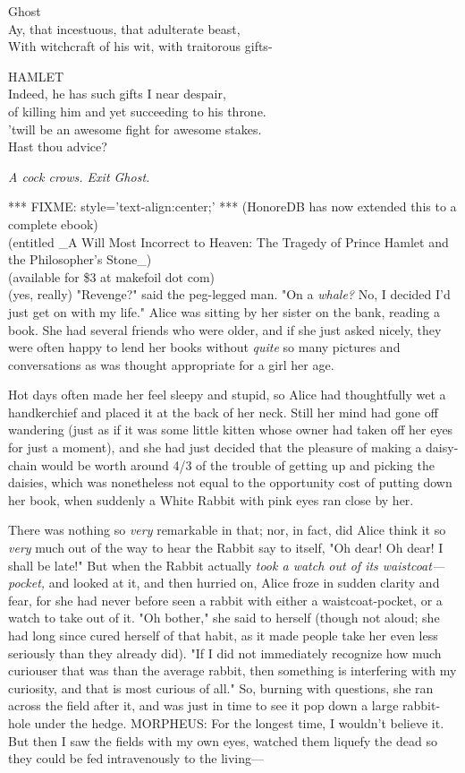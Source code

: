 Ghost\\
Ay, that incestuous, that adulterate beast,\\
With witchcraft of his wit, with traitorous gifts-

HAMLET\\
Indeed, he has such gifts I near despair,\\
of killing him and yet succeeding to his throne.\\
'twill be an awesome fight for awesome stakes.\\
Hast thou advice?

\emph{A cock crows. Exit Ghost.}

*** FIXME: style='text-align:center;' ***
(HonoreDB has now extended this to a complete ebook)\\
(entitled \_A Will Most Incorrect to Heaven: The Tragedy of Prince Hamlet and 
the Philosopher's Stone\_)\\
(available for \$3 at makefoil dot com)\\
(yes, really)
\sbreak
"Revenge?" said the peg-legged man. "On a \emph{whale?} No, I decided I'd just 
get on with my life."
\sbreak
Alice was sitting by her sister on the bank, reading a book. She had several 
friends who were older, and if she just asked nicely, they were often happy to 
lend her books without \emph{quite} so many pictures and conversations as was 
thought appropriate for a girl her age.

Hot days often made her feel sleepy and stupid, so Alice had thoughtfully wet a 
handkerchief and placed it at the back of her neck. Still her mind had gone off 
wandering (just as if it was some little kitten whose owner had taken off her 
eyes for just a moment), and she had just decided that the pleasure of making a 
daisy-chain would be worth around 4/3 of the trouble of getting up and picking 
the daisies, which was nonetheless not equal to the opportunity cost of putting 
down her book, when suddenly a White Rabbit with pink eyes ran close by her.

There was nothing so \emph{very} remarkable in that; nor, in fact, did Alice 
think it so\emph{ very} much out of the way to hear the Rabbit say to itself, 
"Oh dear! Oh dear! I shall be late!" But when the Rabbit actually \emph{took a 
watch out of its waistcoat---pocket,} and looked at it, and then hurried on, 
Alice froze in sudden clarity and fear, for she had never before seen a rabbit 
with either a waistcoat-pocket, or a watch to take out of it. "Oh bother," she 
said to herself (though not aloud; she had long since cured herself of that 
habit, as it made people take her even less seriously than they already did). 
"If I did not immediately recognize how much curiouser that was than the 
average rabbit, then something is interfering with my curiosity, and that is 
most curious of all." So, burning with questions, she ran across the field 
after it, and was just in time to see it pop down a large rabbit-hole under the 
hedge.
\sbreak
MORPHEUS: For the longest time, I wouldn't believe it. But then I saw the 
fields with my own eyes, watched them liquefy the dead so they could be fed 
intravenously to the living---

